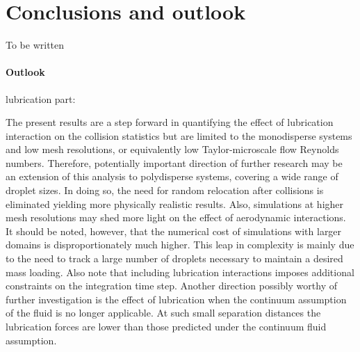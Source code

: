 \documentclass[../thesis.tex]{subfiles}
\begin{document}
\section{Conclusions and outlook\label{sec:con}}

To be written

\paragraph{Outlook}

lubrication part:

The present results are a step forward in quantifying the effect of lubrication interaction on the collision statistics but are limited to the monodisperse systems and low mesh resolutions, or equivalently low Taylor-microscale flow Reynolds numbers. Therefore, potentially important direction of further research may be an extension of this analysis to polydisperse systems, covering a wide range of droplet sizes. In doing so, the need for random relocation after collisions is eliminated yielding more physically realistic results. Also, simulations at higher mesh resolutions may shed more light on the effect of aerodynamic interactions. It should be noted, however, that the numerical cost of simulations with larger domains is disproportionately much higher. This leap in complexity is mainly due to the need to track a large number of droplets necessary to maintain a desired mass loading. Also note that including lubrication interactions imposes additional constraints on the integration time step. Another direction possibly worthy of further investigation is the effect of lubrication when the continuum assumption of the fluid is no longer applicable. At such small separation distances the lubrication forces are lower than those predicted under the continuum fluid assumption.


%
%
\newpage
\end{document}
